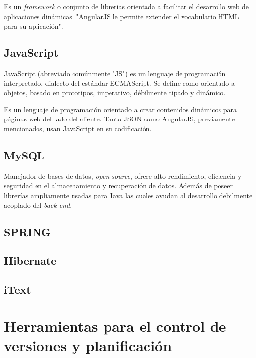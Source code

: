         Es un \textit{framework} o conjunto de librerias orientada a facilitar el desarrollo web de aplicaciones dinámicas. "AngularJS le permite extender el vocabulario HTML para su aplicación"\cite{ANGULARJS-angularjs}.
        
        \subsection{JavaScript}
        
        JavaScript (abreviado comúnmente "JS") es un lenguaje de programación interpretado, dialecto del estándar ECMAScript. Se define como orientado a objetos, basado en prototipos, imperativo, débilmente tipado y dinámico\cite{JAVASCRIPT-wiki}.
        
        Es un lenguaje de programación orientado a crear contenidos dinámicos para páginas web del lado del cliente. Tanto JSON como AngularJS, previamente mencionados, usan JavaScript en su codificación.
        
        \subsection{MySQL}
        
        Manejador de bases de datos, \textit{open source}, ofrece alto rendimiento, eficiencia y seguridad en el almacenamiento y recuperación de datos\cite{MYSQL-oracle}. Además de poseer librerías ampliamente usadas para Java las cuales ayudan al desarrollo debilmente acoplado del \textit{back-end}.
        
        \subsection{SPRING}
        
        \subsection{Hibernate}
        
        \subsection{iText}
        
    \section{Herramientas para el control de versiones y planificación}
    
